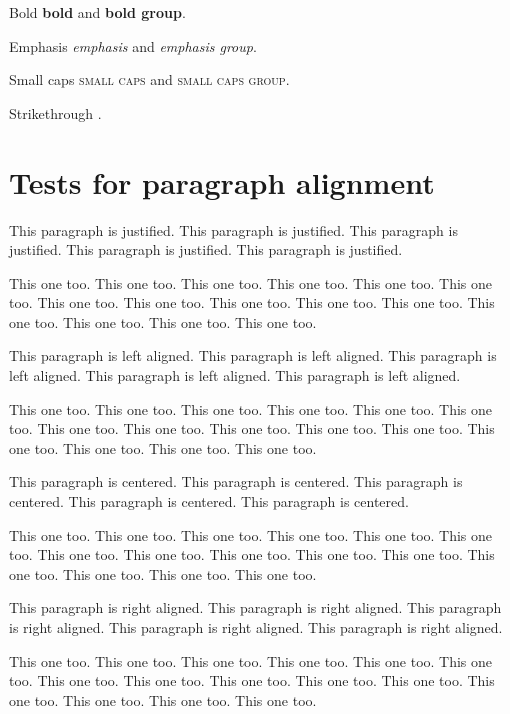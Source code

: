 \documentclass{Metanorma}
\begin{document}
  Bold \textbf{bold} and {\bfseries bold group}.

  Emphasis \textit{emphasis} and {\itshape emphasis group}.

  Small caps \textsc{small caps} and {\scshape small caps group}.

  Strikethrough .

  \section{Tests for paragraph alignment}

  This paragraph is justified.
  This paragraph is justified.
  This paragraph is justified.
  This paragraph is justified.
  This paragraph is justified.

  This one too. This one too. This one too.
  This one too. This one too. This one too.
  This one too. This one too. This one too.
  This one too. This one too. This one too.
  This one too. This one too. This one too.

  \begin{flushleft}
    This paragraph is left aligned.
    This paragraph is left aligned.
    This paragraph is left aligned.
    This paragraph is left aligned.
    This paragraph is left aligned.

    This one too. This one too. This one too.
    This one too. This one too. This one too.
    This one too. This one too. This one too.
    This one too. This one too. This one too.
    This one too. This one too. This one too.
  \end{flushleft}

  \begin{center}
    This paragraph is centered.
    This paragraph is centered.
    This paragraph is centered.
    This paragraph is centered.
    This paragraph is centered.

    This one too. This one too. This one too.
    This one too. This one too. This one too.
    This one too. This one too. This one too.
    This one too. This one too. This one too.
    This one too. This one too. This one too.
  \end{center}

  \begin{flushright}
    This paragraph is right aligned.
    This paragraph is right aligned.
    This paragraph is right aligned.
    This paragraph is right aligned.
    This paragraph is right aligned.

    This one too. This one too. This one too.
    This one too. This one too. This one too.
    This one too. This one too. This one too.
    This one too. This one too. This one too.
    This one too. This one too. This one too.
  \end{flushright}
\end{document}
